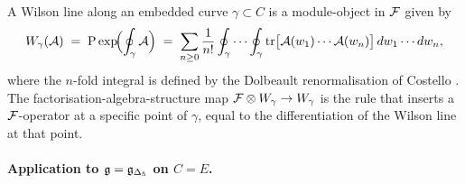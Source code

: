 \begin{proposition}
\label{prop:wilson-line-integral-relation}
A Wilson line along an embedded curve $\gamma\subset C$ is a
module-object in $\mathcal F$ given by
\begin{equation}
\label{eq:wilson-line-as-module}
W_\gamma(\mathcal A)
\;=\;
\mathrm{P}\exp\!\Bigl(\oint_\gamma \mathcal A\Bigr)
\;=\;
\sum_{n\geq 0}\frac{1}{n!}
\oint_\gamma\cdots\oint_\gamma
\mathrm{tr}\bigl[\mathcal A(w_1)\cdots\mathcal A(w_n)\bigr]\,
dw_1\cdots dw_n,
\end{equation}
where the $n$-fold integral is defined by the Dolbeault renormalisation
of Costello \cite[\S11]{costello-renormalization}. The
factorisation-algebra-structure map
$\mathcal F\otimes W_\gamma\to W_\gamma$ is the rule that inserts a
$\mathcal F$-operator at a specific point of $\gamma$, equal to the
differentiation of the Wilson line at that point.
\end{proposition}

\paragraph{Application to $\mathfrak g = \mathfrak g_{\Delta_5}$ on $C = E$.}

